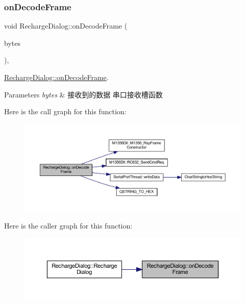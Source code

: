 \subsubsection{\texorpdfstring{onDecodeFrame}{onDecodeFrame}}
{\footnotesize\ttfamily void Recharge\+Dialog\+::on\+Decode\+Frame (\begin{DoxyParamCaption}\item[{Q\+Byte\+Array}]{bytes }\end{DoxyParamCaption})\hspace{0.3cm}{\ttfamily [private]}, {\ttfamily [slot]}}



\mbox{\hyperlink{class_recharge_dialog_ae72f6af3e5f317cecafe239fe830853c}{Recharge\+Dialog\+::on\+Decode\+Frame}}. 


\begin{DoxyParams}{Parameters}
{\em bytes} & 接收到的数据 串口接收槽函数 \\
\hline
\end{DoxyParams}
Here is the call graph for this function\+:
\nopagebreak
\begin{figure}[H]
\begin{center}
\leavevmode
\includegraphics[width=350pt]{class_recharge_dialog_ae72f6af3e5f317cecafe239fe830853c_cgraph}
\end{center}
\end{figure}
Here is the caller graph for this function\+:
\nopagebreak
\begin{figure}[H]
\begin{center}
\leavevmode
\includegraphics[width=350pt]{class_recharge_dialog_ae72f6af3e5f317cecafe239fe830853c_icgraph}
\end{center}
\end{figure}


